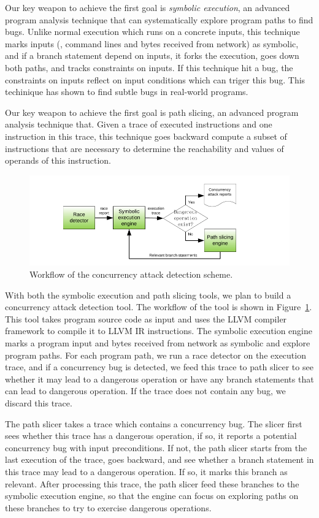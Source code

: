 Our key weapon to achieve the first goal is \emph{symbolic execution}, an 
advanced program analysis technique that can systematically explore program 
paths to find bugs. Unlike normal execution which runs on a concrete 
inputs, this technique marks inputs (\eg, command lines and bytes received from 
network) as symbolic, and if a branch statement depend on inputs, it forks the 
execution, goes down both paths, and tracks constraints on inputs. If this 
technique hit a bug, the constraints on inputs reflect on input conditions 
which can triger this bug. This techinique has shown to find subtle bugs in 
real-world programs.

Our key weapon to achieve the first goal is path slicing, an advanced program 
analysis technique that. Given a trace of executed instructions and one 
instruction in this trace, this technique goes backward compute a subset of 
instructions that are necessary to determine the reachability and values of 
operands of this instruction.

\begin{figure}[t]
\centering
\includegraphics[width=0.5\columnwidth]{figures/detection}
\vspace{-.05in}
\caption{{Workflow of the concurrency attack detection scheme.}} 
\label{fig:detection}
\vspace{-.05in}
\end{figure}

With both the symbolic execution and path slicing tools, we plan to build a 
concurrency attack detection tool. The workflow of the tool is shown in 
Figure~\ref{fig:detection}. This tool takes program source code as input and 
uses the LLVM compiler framework to compile it to LLVM IR instructions. The 
symbolic execution engine marks a program input and bytes received from network 
as symbolic and explore program paths. For each program path, we run a race 
detector on the execution trace, and if a concurrency bug is detected, we feed 
this trace to path slicer to see whether it may lead to a dangerous operation 
or have any branch statements that can lead to dangerous operation. If the 
trace does not contain any bug, we discard this trace.

The path slicer takes a trace which contains a concurrency bug. The slicer 
first sees whether this trace has a dangerous operation, if so, it reports a 
potential concurrency bug with input preconditions. If not, the path slicer 
starts from the last execution of the trace, goes backward, and see whether a 
branch statement in this trace may lead to a dangerous operation. If so, it 
marks this branch as relevant. After processing this trace, the path slicer 
feed these branches to the symbolic execution engine, so that the engine can 
focus on exploring paths on these branches to try to exercise dangerous 
operations.

